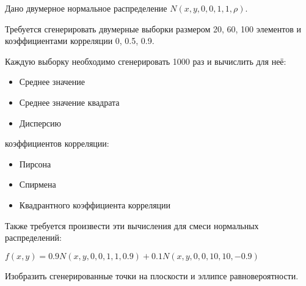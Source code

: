 Дано двумерное нормальное распределение $N(x, y, 0, 0, 1, 1, \rho)$.

Требуется сгенерировать двумерные выборки размером 20, 60, 100 элементов и коэффициентами корреляции 0, 0.5, 0.9.

Каждую выборку необходимо сгенерировать 1000 раз и вычислить для неё:
\begin{itemize}
	\item Среднее значение
	\item Среднее значение квадрата
	\item Дисперсию
\end{itemize}
коэффициентов корреляции:
\begin{itemize}
	\item Пирсона
	\item Спирмена
	\item Квадрантного коэффициента корреляции
\end{itemize}

Также требуется произвести эти вычисления для смеси нормальных распределений:

$f(x, y) = 0.9N(x, y, 0, 0, 1, 1, 0.9) + 0.1N(x, y, 0, 0, 10, 10, -0.9)$

Изобразить сгенерированные точки на плоскости и эллипсе равновероятности.	
